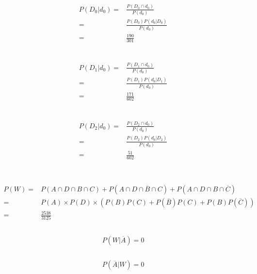 \documentclass{article}
\begin{document}
        \subsection{}
            \begin{equation*}
                \begin{split}
                    P(D_0|d_0)=&\frac{P(D_0\cap d_0)}{P(d_0)}\\
                        =&\frac{P(D_0)P(d_0|D_0)}{P(d_0)}\\
                        =&\frac{190}{301}\\
                \end{split}
            \end{equation*}
        \subsection{}
            \begin{equation*}
                \begin{split}
                    P(D_1|d_0)=&\frac{P(D_1\cap d_0)}{P(d_0)}\\
                        =&\frac{P(D_1)P(d_0|D_1)}{P(d_0)}\\
                        =&\frac{171}{602}\\
                \end{split}
            \end{equation*}
        \subsection{}
            \begin{equation*}
                \begin{split}
                    P(D_2|d_0)=&\frac{P(D_2\cap d_0)}{P(d_0)}\\
                        =&\frac{P(D_2)P(d_0|D_2)}{P(d_0)}\\
                        =&\frac{51}{602}\\
                \end{split}
            \end{equation*}
    \section{}
        \subsection{}
            \begin{equation*}
                \begin{split}
                    P(W)=&P(A\cap D\cap B\cap C)+P(A\cap D\cap \overline{B}\cap C)+P(A\cap D\cap B\cap \overline{C})\\
                        =&P(A)\times P(D)\times(P(B)P(C)+P(\overline{B})P(C)+P(B)P(\overline{C}))\\
                        =&\frac{2538}{3125}
                \end{split}
            \end{equation*}
        \subsection{}
            $$P(W|\overline{A})=0$$
        \subsection{}
            $$P(\overline{A}|W)=0$$
\end{document}

